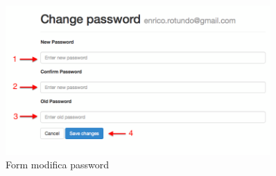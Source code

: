 \begin{enumerate}
			\begin{figure}[H]
				\centering \includegraphics[width=0.9\textwidth]{img/changePwdForm.png}
			\caption{ \label{fig:changePwdForm} Form modifica password}
			\end{figure}

		\end{enumerate}
